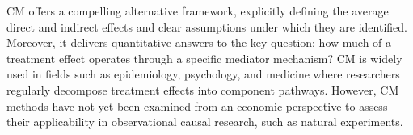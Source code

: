 
CM offers a compelling alternative framework, explicitly defining the average direct and indirect effects and clear assumptions under which they are identified.
Moreover, it delivers quantitative answers to the key question: how much of a treatment effect operates through a specific mediator mechanism?
CM is widely used in fields such as epidemiology, psychology, and medicine where researchers regularly decompose treatment effects into component pathways.
However, CM methods have not yet been examined from an economic perspective to assess their applicability in observational causal research, such as natural experiments.

